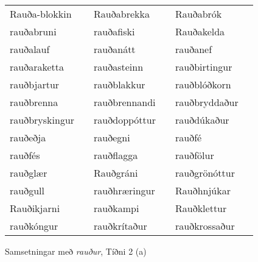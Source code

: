 \documentclass[../samsetningasafn.tex]{subfiles}
\begin{document}
\begin{wordlist}[H]
\begin{tcolorbox}
\begin{tabular}{BlBlBl}
		Rauða-blokkin	&		& 	
		Rauðabrekka		&		& 	
		Rauðabrók		&		\\ 		%
		rauðabruni		&		& 		
		rauðafiski		&		& 		
		Rauðakelda		&		\\ 		%
		rauðalauf		&		& 		
		rauðanátt		&		& 		
		rauðanef			&		\\ 		%
		rauðaraketta		&		& 	
		rauðasteinn		&		& 		
		rauðbirtingur		&		\\ 	%
		rauðbjartur		&		& 		
		rauðblakkur		&		& 		
		rauðblóðkorn		&		\\ 	%
		rauðbrenna		&		& 		
		rauðbrennandi	&		& 	
		rauðbryddaður	&		\\ 	%
		rauðbryskingur	&		& 	
		rauðdoppóttur	&		& 	
		rauðdúkaður		&		\\ 	%
		rauðeðja			&		& 		
		rauðegni			&		& 		
		rauðfé			&		\\ 			%
		rauðfés			&		& 		
		rauðflagga		& 		& 		
		rauðfölur		&		\\ 		%
		rauðglær		&		& 		
		Rauðgráni		&		& 		
		rauðgrönóttur	&		\\ 	%
		rauðgull			&		& 		
		rauðhræringur	&		& 	
		Rauðhnjúkar		&		\\ 	%
		Rauðikjarni		& 		& 		
		rauðkampi		&		& 		
		Rauðklettur		&		\\ 		 %
		rauðkóngur		&		& 		
		rauðkrítaður		&		& 	
		rauðkrossaður	&		 	%
	\end{tabular}

\end{tcolorbox}
	\caption{Samsetningar með \textit{rauður}, Tíðni 2 (a)}
	\label{listi:rautt.2a}
\end{wordlist}	
		
\end{document}
